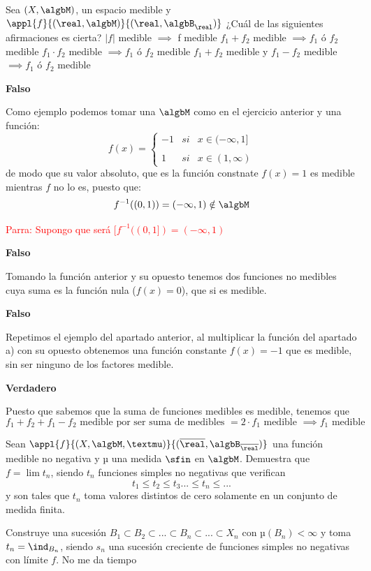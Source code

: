 \begin{problem}[2]
Sea $(X,\algbM)$, un espacio medible y $\appl{f}{(\real,\algbM)}{(\real, \algbB_{\real})}$ ¿Cuál de las siguientes afirmaciones es cierta?
\ppart $|f|$ medible $\implies$ f medible
\ppart $f_1+f_2$ medible $\implies f_1$ ó $f_2$ medible
\ppart $f_1\cdot f_2$ medible $\implies f_1$ ó $f_2$ medible
\ppart $f_1+f_2$ medible y $f_1-f_2$ medible $\implies f_1$ ó $f_2$ medible
\solution

\spart
\textbf{Falso}

Como ejemplo podemos tomar una $\algbM$ como en el ejercicio anterior y una función:
\[
f(x)= \left\{ \begin{array}{lcc}
             -1 &   si  & x \in  (-\infty, 1] \\
             \\ 1 &  si  & x \in (1, \infty)
             \end{array}
   \right.
\]
de modo que su valor absoluto, que es la función constnate $f(x)=1$ es medible mientras $f$ no lo es, puesto que:
\[f^{-1}((0,1)) = (-\infty, 1) \notin \algbM\]

\textcolor{red}{Parra: Supongo que será $[f^{-1}((0,1]) = (-\infty, 1)$ }

\spart
\textbf{Falso}

Tomando la función anterior y su opuesto tenemos dos funciones no medibles cuya suma es la función nula ($f(x)=0$), que si es medible.

\spart
\textbf{Falso}

Repetimos el ejemplo del apartado anterior, al multiplicar la función del apartado a) con su opuesto obtenemos una función constante $f(x)=-1$ que es medible, sin ser ninguno de los factores medible.

\spart
\textbf{Verdadero}

Puesto que sabemos que la suma de funciones medibles es medible, tenemos que
\[f_1 + f_2 + f_1 -f_2 \text{ medible por ser suma de medibles } = 2\cdot f_1 \text{ medible } \implies f_1 \text{ medible}\]

\end{problem}

\begin{problem}[3]
Sean $\appl{f}{(X, \algbM, µ)}{(\overline{\real}, \algbB_{\overline{\real}})}$ una función medible no negativa y µ una medida $\sfin$ en $\algbM$. Demuestra que $f= \lim t_n$, siendo $t_n$ funciones simples no negativas que verifican
\[t_1 \leq t_2 \leq t_3 ...\leq t_n \leq ...\]
y son tales que $t_n$ toma valores distintos de cero solamente en un conjunto de medida finita.

\obs Construye una sucesión $B_1 \subset B_2 \subset ... \subset B_n \subset ... \subset X_n$ con $µ(B_n)<\infty$ y toma $t_n=\ind_{B_n}$, siendo $s_n$ una sucesión creciente de funciones simples no negativas con límite $f$.
\solution
No me da tiempo
\end{problem}

